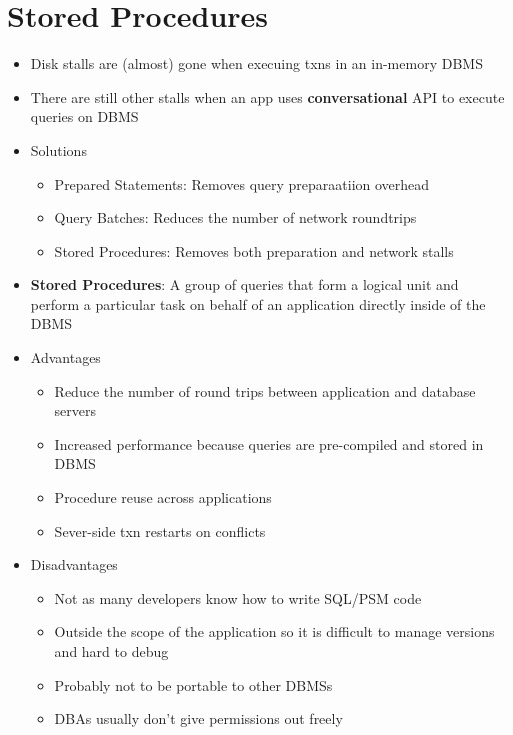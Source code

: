 \documentclass[11pt]{article}
\begin{document}
\maketitle
\thispagestyle{plain}

\section{Stored Procedures}
\begin{itemize}
    \item Disk stalls are (almost) gone when execuing txns in an in-memory DBMS
    \item There are still other stalls when an app uses \textbf{conversational} API to execute queries on DBMS
    \item Solutions
    \begin{itemize}
        \item Prepared Statements: Removes query preparaatiion overhead
        \item Query Batches: Reduces the number of network roundtrips
        \item Stored Procedures: Removes both preparation and network stalls
    \end{itemize}
    \item \textbf{Stored Procedures}: A group of queries that form a logical unit and perform a particular task on behalf of an application directly inside of the DBMS
    \item Advantages
    \begin{itemize}
        \item Reduce the number of round trips between application and database servers
        \item Increased performance because queries are pre-compiled and stored in DBMS
        \item Procedure reuse across applications
        \item Sever-side txn restarts on conflicts
    \end{itemize}
    \item Disadvantages
    \begin{itemize}
        \item Not as many developers know how to write SQL/PSM code
        \item Outside the scope of the application so it is difficult to manage versions and hard to debug
        \item Probably not to be portable to other DBMSs
        \item DBAs usually don't give permissions out freely
    \end{itemize}
\end{itemize}
\end{document}

